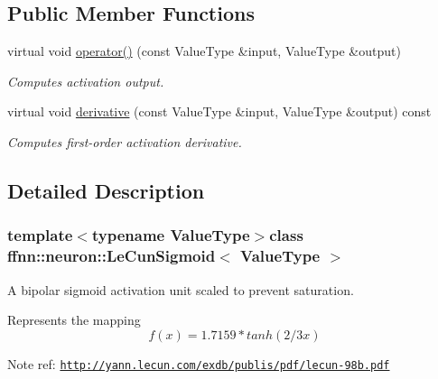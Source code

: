 \subsection*{Public Member Functions}
\begin{DoxyCompactItemize}
\item 
virtual void \hyperlink{classffnn_1_1neuron_1_1_le_cun_sigmoid_ae1a0a4b086a8983f31fb320e7c3088dc}{operator()} (const Value\-Type \&input, Value\-Type \&output)
\begin{DoxyCompactList}\small\item\em Computes activation output. \end{DoxyCompactList}\item 
virtual void \hyperlink{classffnn_1_1neuron_1_1_le_cun_sigmoid_a4802deb108ab8ca6a67a4d7d55124fb2}{derivative} (const Value\-Type \&input, Value\-Type \&output) const 
\begin{DoxyCompactList}\small\item\em Computes first-\/order activation derivative. \end{DoxyCompactList}\end{DoxyCompactItemize}


\subsection{Detailed Description}
\subsubsection*{template$<$typename Value\-Type$>$class ffnn\-::neuron\-::\-Le\-Cun\-Sigmoid$<$ Value\-Type $>$}

A bipolar sigmoid activation unit scaled to prevent saturation. 

Represents the mapping \[ f(x) = 1.7159 * tanh(2/3 x) \]

\begin{DoxyNote}{Note}
ref\-: \href{http://yann.lecun.com/exdb/publis/pdf/lecun-98b.pdf}{\tt http\-://yann.\-lecun.\-com/exdb/publis/pdf/lecun-\/98b.\-pdf} 
\end{DoxyNote}


